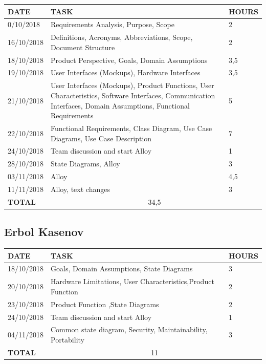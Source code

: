 \documentclass[12pt]{article}
\begin{document}
\begin{center}
\begin{tabular}{ |p{}|p{}|p{}| } 
 \hline
 \textbf{DATE} & \textbf{TASK} & \textbf{HOURS} \\ 
  \hline
  0/10/2018 & Requirements Analysis, Purpose, Scope & 2 \\ 
  \hline
  16/10/2018 & Definitions, Acronyms, Abbreviations, Scope, Document Structure & 2 \\ 
  \hline
  18/10/2018 & Product Perspective, Goals, Domain Assumptions & 3,5 \\ 
  \hline
  19/10/2018 & User Interfaces (Mockups), Hardware Interfaces & 3,5 \\ 
  \hline
  21/10/2018 & User Interfaces (Mockups), Product Functions, User Characteristics, Software Interfaces, Communication Interfaces, Domain Assumptions, Functional Requirements & 5 \\ 
  \hline
  22/10/2018 & Functional Requirements, Class Diagram, Use Case Diagrams, Use Case Description & 7 \\ 
  \hline
  24/10/2018 & Team discussion and start Alloy & 1 \\ 
  \hline
  28/10/2018 & State Diagrams, Alloy & 3 \\ 
  \hline
  03/11/2018 & Alloy & 4,5 \\ 
  \hline
  11/11/2018 & Alloy, text changes & 3 \\ 

  \hline
  \textbf{TOTAL} & \multicolumn{2}{c|}{34,5} \\ 
  \hline
\end{tabular}
\end{center}


\subsection{Erbol Kasenov}

\begin{center}
\begin{tabular}{ |p{}|p{}|p{}| } 
 \hline
 \textbf{DATE} & \textbf{TASK} & \textbf{HOURS} \\ 
  \hline
  18/10/2018 & Goals, Domain Assumptions, State Diagrams & 3\\ 
  \hline
  20/10/2018 & Hardware Limitations, User Characteristics,Product Function & 2 \\ 
  \hline
  23/10/2018 & Product Function ,State Diagrams & 2 \\ 
  \hline
  24/10/2018 & Team discussion and start Alloy & 1 \\ 
  \hline
  04/11/2018 & Common state diagram, Security,  Maintainability,  Portability & 3 \\
  \hline
  \textbf{TOTAL} & \multicolumn{2}{c|}{11} \\ 
  \hline
\end{tabular}
\end{center}
\end{document}
